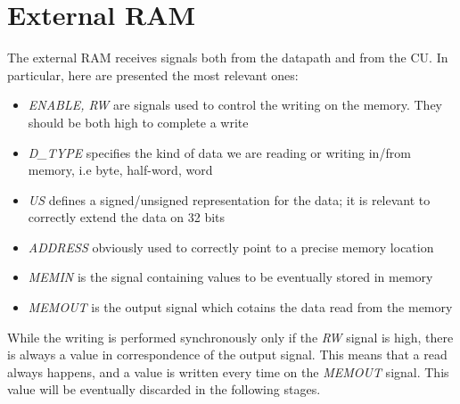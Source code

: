 \section{External RAM}
\label{ram}
The external RAM receives signals both from the datapath and from the CU. In particular, here are presented the most relevant ones:
\begin{itemize}
	\item \textit{ENABLE, RW} are signals used to control the writing on the memory. They should be both high to complete a write
	\item \textit{D\_TYPE} specifies the kind of data we are reading or writing in/from memory, i.e byte, half-word, word
	\item \textit{US} defines a signed/unsigned representation for the data; it is relevant to correctly extend the data on 32 bits
	\item \textit{ADDRESS} obviously used to correctly point to a precise memory location
	\item \textit{MEMIN} is the signal containing values to be eventually stored in memory
	\item \textit{MEMOUT} is the output signal which cotains the data read from the memory
\end{itemize}

While the writing is performed synchronously only if the \textit{RW} signal is high, there is always a value in correspondence of the output signal. This means that a read always happens, and a value is written every time on the \textit{MEMOUT} signal. This value will be eventually discarded in the following stages.


